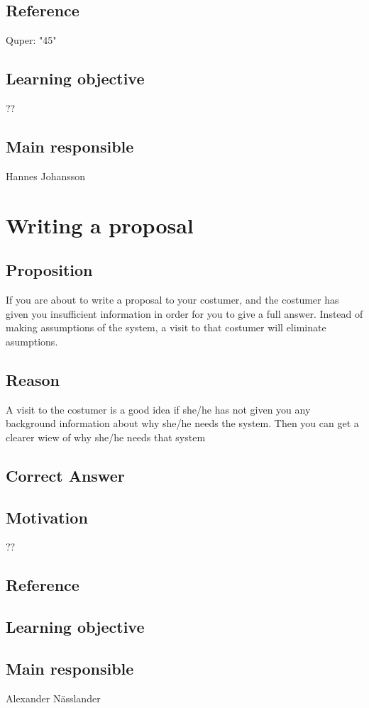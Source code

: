 \documentclass[a4paper]{article}
\begin{document}
\subsection*{Reference}
Quper: "45"
\subsection*{Learning objective}
??
\subsection*{Main responsible}
Hannes Johansson


\section{Writing a proposal}
\subsection*{Proposition}
If you are about to write a proposal to your costumer, and the costumer has given you insufficient information in order for you to give a
full answer. Instead of making assumptions of the system, a visit to that costumer will eliminate asumptions.   
\subsection*{Reason}
A visit to the costumer is a good idea if she/he has not given you any background information about why she/he needs the system.
Then you can get a clearer wiew of why she/he needs that system
\subsection*{Correct Answer}

\subsection*{Motivation}
 ??
\subsection*{Reference}

\subsection*{Learning objective}

\subsection*{Main responsible}
Alexander Nässlander
\end{document}

